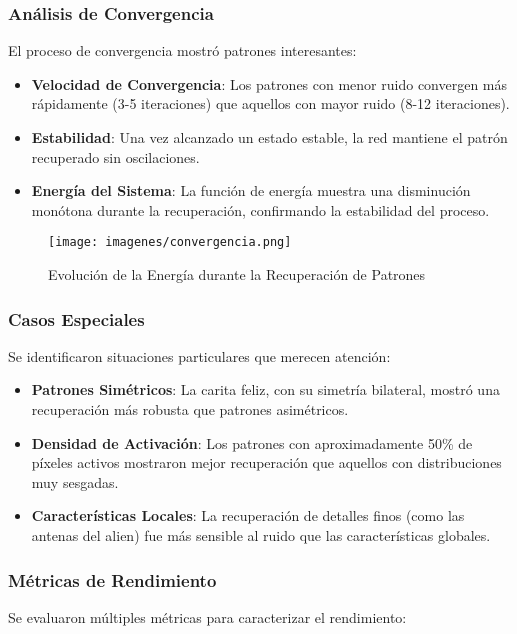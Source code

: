\documentclass{article}
\begin{document}
\subsubsection{Análisis de Convergencia}
El proceso de convergencia mostró patrones interesantes:

\begin{itemize}
    \item \textbf{Velocidad de Convergencia}: Los patrones con menor ruido convergen más rápidamente (3-5 iteraciones) que aquellos con mayor ruido (8-12 iteraciones).
    \item \textbf{Estabilidad}: Una vez alcanzado un estado estable, la red mantiene el patrón recuperado sin oscilaciones.
    \item \textbf{Energía del Sistema}: La función de energía muestra una disminución monótona durante la recuperación, confirmando la estabilidad del proceso.
\end{itemize}

\begin{figure}[h]
    \centering
    \texttt{[image: imagenes/convergencia.png]}
    \caption{Evolución de la Energía durante la Recuperación de Patrones}
    \label{fig:convergencia_energia}
\end{figure}

\subsubsection{Casos Especiales}
Se identificaron situaciones particulares que merecen atención:

\begin{itemize}
    \item \textbf{Patrones Simétricos}: La carita feliz, con su simetría bilateral, mostró una recuperación más robusta que patrones asimétricos.
    \item \textbf{Densidad de Activación}: Los patrones con aproximadamente 50\% de píxeles activos mostraron mejor recuperación que aquellos con distribuciones muy sesgadas.
    \item \textbf{Características Locales}: La recuperación de detalles finos (como las antenas del alien) fue más sensible al ruido que las características globales.
\end{itemize}

\subsubsection{Métricas de Rendimiento}
Se evaluaron múltiples métricas para caracterizar el rendimiento:
\end{document}
